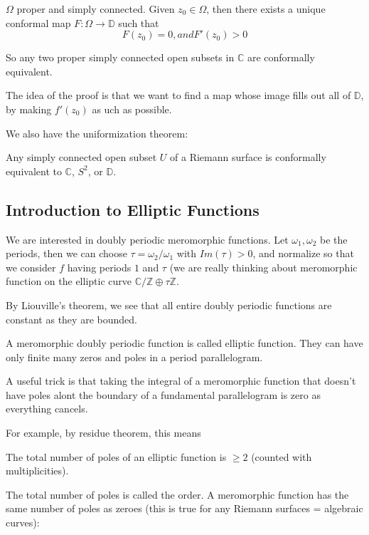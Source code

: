 \documentclass[main.tex]{subfiles}
\begin{document}
\begin{theorem}
$\Omega$ proper and simply connected. Given $z_0 \in \Omega$, then there exists a unique conformal map $F: \Omega \rightarrow \mathbb{D}$ such that 
$$
F(z_0) = 0, and F'(z_0) > 0
$$
\end{theorem}
So any two proper simply connected open subsets in $\mathbb{C}$ are conformally equivalent.

The idea of the proof is that we want to find a map whose image fills out all of $\mathbb{D}$, by making $f'(z_0)$ as uch as possible.

We also have the uniformization theorem:

\begin{theorem}
Any simply connected open subset $U$ of a Riemann surface is conformally equivalent to $\mathbb{C}$, $S^2$, or $\mathbb{D}$.
\end{theorem}

\subsection{Introduction to Elliptic Functions}

We are interested in doubly periodic meromorphic functions. Let $\omega_1, \omega_2$ be the periods, then we can choose $\tau = \omega_2/\omega_1$ with $Im(\tau)> 0$, and normalize so that we consider $f$ having periods $1$ and $\tau$ (we are really thinking about meromorphic function on the elliptic curve $\mathbb{C}/\mathbb{Z} \oplus \tau \mathbb{Z}$.

By Liouville's theorem, we see that all entire doubly periodic functions are constant as they are bounded.

A meromorphic doubly periodic function is called elliptic function. They can have only finite many zeros and poles in a period parallelogram.

A useful trick is that taking the integral of a meromorphic function that doesn't have poles alont the boundary of a fundamental parallelogram is zero as everything cancels.

For example, by residue theorem, this means 
\begin{theorem}
The total number of poles of an elliptic function is $\geq 2$ (counted with multiplicities).
\end{theorem}
The total number of poles is called the order.
A meromorphic function has the same number of poles as zeroes (this is true for any Riemann surfaces = algebraic curves):
\end{document}
